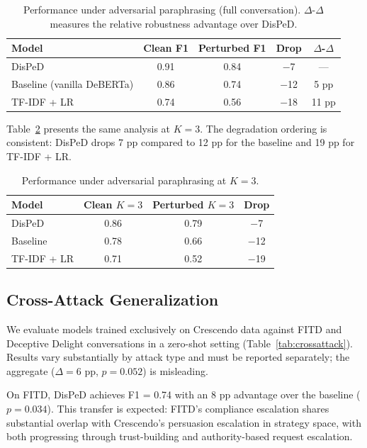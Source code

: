 \documentclass[11pt,a4paper]{article}
\begin{document}
\begin{table}[t]
\centering
\small
\caption{Performance under adversarial paraphrasing (full conversation). $\Delta$-$\Delta$ measures the relative robustness advantage over DisPeD.}
\label{tab:perturbation}
\begin{tabular}{lcccc}
\toprule
\textbf{Model} & \textbf{Clean F1} & \textbf{Perturbed F1} & \textbf{Drop} & \textbf{$\Delta$-$\Delta$} \\
\midrule
DisPeD & 0.91 & 0.84 & $-$7 & --- \\
Baseline (vanilla DeBERTa) & 0.86 & 0.74 & $-$12 & 5 pp \\
TF-IDF + LR & 0.74 & 0.56 & $-$18 & 11 pp \\
\bottomrule
\end{tabular}
\end{table}

Table~\ref{tab:perturbation_k3} presents the same analysis at $K{=}3$.
The degradation ordering is consistent: DisPeD drops 7 pp compared to 12 pp for the baseline and 19 pp for TF-IDF + LR.

\begin{table}[t]
\centering
\small
\caption{Performance under adversarial paraphrasing at $K{=}3$.}
\label{tab:perturbation_k3}
\begin{tabular}{lccc}
\toprule
\textbf{Model} & \textbf{Clean $K{=}3$} & \textbf{Perturbed $K{=}3$} & \textbf{Drop} \\
\midrule
DisPeD & 0.86 & 0.79 & $-$7 \\
Baseline & 0.78 & 0.66 & $-$12 \\
TF-IDF + LR & 0.71 & 0.52 & $-$19 \\
\bottomrule
\end{tabular}
\end{table}

\subsection{Cross-Attack Generalization}
\label{sec:crossattack}

We evaluate models trained exclusively on Crescendo data against FITD and Deceptive Delight conversations in a zero-shot setting (Table~\ref{tab:crossattack}).
Results vary substantially by attack type and must be reported separately; the aggregate ($\Delta{=}6$ pp, $p{=}0.052$) is misleading.

On FITD, DisPeD achieves F1 = 0.74 with an 8 pp advantage over the baseline ($p{=}0.034$).
This transfer is expected: FITD's compliance escalation shares substantial overlap with Crescendo's persuasion escalation in strategy space, with both progressing through trust-building and authority-based request escalation.
\end{document}
